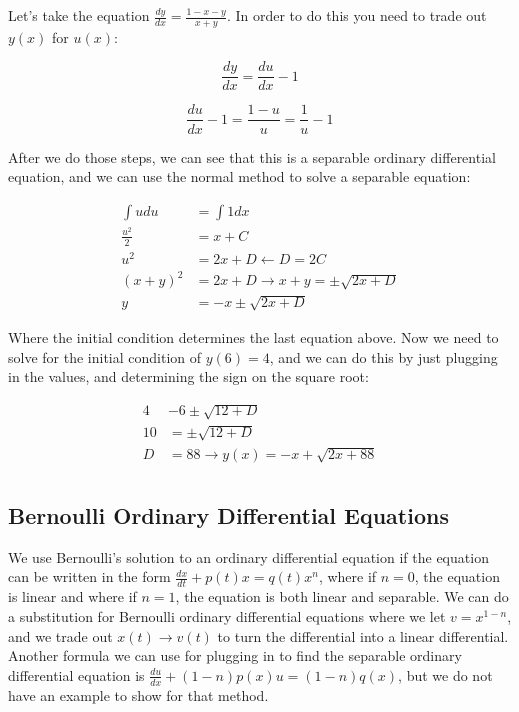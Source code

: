     \begin{problem}
      Let's take the equation $\frac{dy}{dx}=\frac{1-x-y}{x+y}$. In order to do this you need to trade out $y(x)$ for $u(x)$:

      \begin{equation}
        \frac{dy}{dx}=\frac{du}{dx}-1
      \end{equation}

      \begin{equation}
        \frac{du}{dx}-1=\frac{1-u}{u}=\frac{1}{u}-1
      \end{equation}

      After we do those steps, we can see that this is a separable ordinary differential equation, and we can use the normal method to solve a separable equation:

      \begin{equation}
        \begin{aligned}
          \int udu&=\int1dx\\
          \frac{u^2}{2}&=x+C\\
          u^2&=2x+D\leftarrow D=2C\\
          (x+y)^2&=2x+D\rightarrow x+y=\pm\sqrt{2x+D}\\
          y&=-x\pm\sqrt{2x+D}
        \end{aligned}
      \end{equation}

      Where the initial condition determines the last equation above. Now we need to solve for the initial condition of $y(6)=4$, and we can do this by just plugging in the values, and determining the sign on the square root:

      \begin{equation}
        \begin{aligned}
           4&-6\pm\sqrt{12+D}\\
          10&=\pm\sqrt{12+D}\\
          D&=88\to y(x)=-x+\sqrt{2x+88}\\
        \end{aligned}
      \end{equation}
    \end{problem}

  \subsection{Bernoulli Ordinary Differential Equations}

    We use Bernoulli's solution to an ordinary differential equation if the equation can be written in the form $\frac{dx}{dt}+p(t)x=q(t)x^n$, where if $n=0$, the equation is linear and where if $n=1$, the equation is both linear and separable. We can do a substitution for Bernoulli ordinary differential equations where we let $v=x^{1-n}$, and we trade out $x(t)\to v(t)$ to turn the differential into a linear differential. Another formula we can use for plugging in to find the separable ordinary differential equation is $\frac{du}{dx}+(1-n)p(x)u=(1-n)q(x)$, but we do not have an example to show for that method. 

